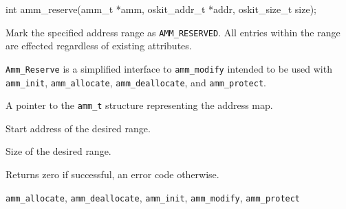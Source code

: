 \begin{apisyn}

	\funcproto int amm_reserve(amm_t *amm,
			oskit_addr_t *addr, oskit_size_t size);
\end{apisyn}
\begin{apidesc}
	Mark the specified address range as {\tt AMM_RESERVED}.
	All entries within the range are effected
	regardless of existing attributes.

	{\tt Amm_Reserve} is a simplified interface to {\tt amm_modify}
	intended to be used with {\tt amm_init}, {\tt amm_allocate},
	{\tt amm_deallocate}, and {\tt amm_protect}.
\end{apidesc}
\begin{apiparm}
	\item[amm]
		A pointer to the {\tt amm_t} structure
		representing the address map.
	\item[addr]
		Start address of the desired range.
	\item[size]
		Size of the desired range.
\end{apiparm}
\begin{apiret}
	Returns zero if successful, an error code otherwise.
\end{apiret}
\begin{apirel}
	{\tt amm_allocate}, {\tt amm_deallocate}, {\tt amm_init},
	{\tt amm_modify}, {\tt amm_protect}
\end{apirel}


